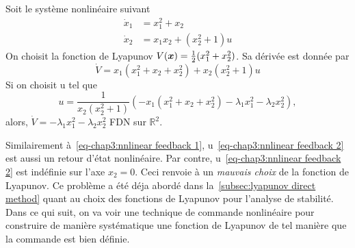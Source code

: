 \begin{example}
	Soit le système nonlinéaire suivant 
	\begin{align*}
		\dot{x}_1 &= x_1^2 + x_2 \\
		\dot{x}_2 &= x_1x_2 + (x_2^2+1)u
	\end{align*}
	On choisit la fonction de Lyapunov $V(\bm{x}) = \frac{1}{2}(x_1^2 + x_2^2)$. Sa dérivée est donnée par 
	\begin{equation*}
		\dot{V} = x_1(x_1^2 + x_2 + x_2^2) + x_2(x_2^2 +1)u
	\end{equation*}
	Si on  choisit  u tel que 
	\begin{equation}\label{eq-chap3:nnlinear feedback 2}
		u=\frac{1}{x_2(x_2^2+1)}\left(-x_1(x_1^2 + x_2 + x_2^2)  - \lambda_1x_1^2 -\lambda_2x_2^2\right),
	\end{equation}
	alors, $\dot{V} = - \lambda_1x_1^2 -\lambda_2x_2^2$ FDN sur $\mathbb{R}^2$. 
\end{example}
Similairement à~\eqref{eq-chap3:nnlinear feedback 1}, u~\eqref{eq-chap3:nnlinear feedback 2} est aussi un retour d'état nonlinéaire. Par contre, u~\eqref{eq-chap3:nnlinear feedback 2} est indéfinie sur l'axe $x_2=0$. Ceci  renvoie à un \emph{mauvais choix} de la fonction de Lyapunov. Ce problème a été déja abordé dans la~\cref{subsec:lyapunov direct method} quant au choix des fonctions de Lyapunov pour l'analyse de stabilité. Dans ce qui suit, on va voir une technique de commande nonlinéaire pour construire de manière systématique une fonction de Lyapunov de tel manière que la commande est bien définie.  
